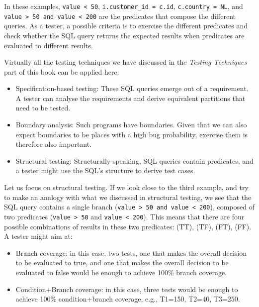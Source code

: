 In these examples, \texttt{value\ \textless{}\ 50},
\texttt{i.customer\_id\ =\ c.id},
\texttt{c.country\ =\ \textquotesingle{}NL\textquotesingle{}}, and
\texttt{value\ \textgreater{}\ 50\ and\ value\ \textless{}\ 200} are the
predicates that compose the different queries. As a tester, a possible
criteria is to exercise the different predicates and check whether the
SQL query returns the expected results when predicates are evaluated to
different results.

Virtually all the testing techniques we have discussed in the
\emph{Testing Techniques} part of this book can be applied here:

\begin{itemize}
\tightlist
\item
  Specification-based testing: These SQL queries emerge out of a
  requirement. A tester can analyse the requirements and derive
  equivalent partitions that need to be tested.
\item
  Boundary analysis: Such programs have boundaries. Given that we can
  also expect boundaries to be places with a high bug probability,
  exercise them is therefore also important.
\item
  Structural testing: Structurally-speaking, SQL queries contain
  predicates, and a tester might use the SQL's structure to derive test
  cases.
\end{itemize}

Let us focus on structural testing. If we look close to the third
example, and try to make an analogy with what we discussed in structural
testing, we see that the SQL query contains a single branch
(\texttt{value\ \textgreater{}\ 50\ and\ value\ \textless{}\ 200}),
composed of two predicates (\texttt{value\ \textgreater{}\ 50} and
\texttt{value\ \textless{}\ 200}). This means that there are four
possible combinations of results in these two predicates: (TT), (TF),
(FT), (FF). A tester might aim at:

\begin{itemize}
\tightlist
\item
  Branch coverage: in this case, two tests, one that makes the overall
  decision to be evaluated to true, and one that makes the overall
  decision to be evaluated to false would be enough to achieve 100\%
  branch coverage.
\item
  Condition+Branch coverage: in this case, three tests would be enough
  to achieve 100\% condition+branch coverage, e.g., T1=150, T2=40,
  T3=250.
\end{itemize}

